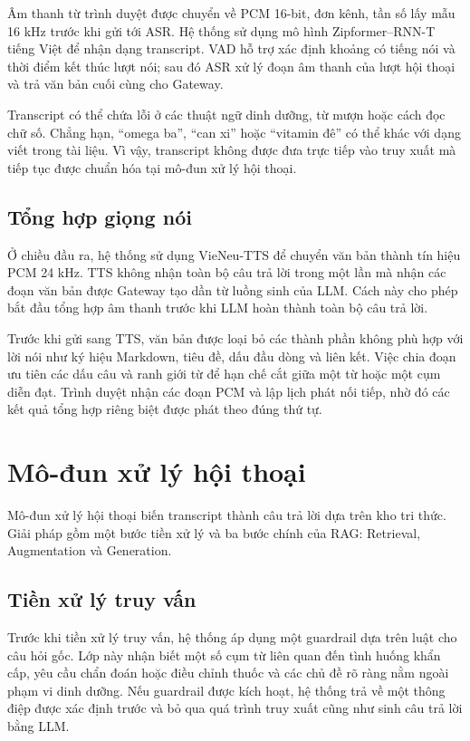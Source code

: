 \documentclass[a4paper,13pt,oneside]{report}
\begin{document}
Âm thanh từ trình duyệt được chuyển về PCM 16-bit, đơn kênh, tần số lấy mẫu 16 kHz trước khi gửi tới ASR. Hệ thống sử dụng mô hình Zipformer--RNN-T tiếng Việt để nhận dạng transcript. VAD hỗ trợ xác định khoảng có tiếng nói và thời điểm kết thúc lượt nói; sau đó ASR xử lý đoạn âm thanh của lượt hội thoại và trả văn bản cuối cùng cho Gateway.

Transcript có thể chứa lỗi ở các thuật ngữ dinh dưỡng, từ mượn hoặc cách đọc chữ số. Chẳng hạn, ``omega ba'', ``can xi'' hoặc ``vitamin đê'' có thể khác với dạng viết trong tài liệu. Vì vậy, transcript không được đưa trực tiếp vào truy xuất mà tiếp tục được chuẩn hóa tại mô-đun xử lý hội thoại.

\subsection{Tổng hợp giọng nói}

Ở chiều đầu ra, hệ thống sử dụng VieNeu-TTS để chuyển văn bản thành tín hiệu PCM 24 kHz. TTS không nhận toàn bộ câu trả lời trong một lần mà nhận các đoạn văn bản được Gateway tạo dần từ luồng sinh của LLM. Cách này cho phép bắt đầu tổng hợp âm thanh trước khi LLM hoàn thành toàn bộ câu trả lời.

Trước khi gửi sang TTS, văn bản được loại bỏ các thành phần không phù hợp với lời nói như ký hiệu Markdown, tiêu đề, dấu đầu dòng và liên kết. Việc chia đoạn ưu tiên các dấu câu và ranh giới từ để hạn chế cắt giữa một từ hoặc một cụm diễn đạt. Trình duyệt nhận các đoạn PCM và lập lịch phát nối tiếp, nhờ đó các kết quả tổng hợp riêng biệt được phát theo đúng thứ tự.

\section{Mô-đun xử lý hội thoại}

Mô-đun xử lý hội thoại biến transcript thành câu trả lời dựa trên kho tri thức. Giải pháp gồm một bước tiền xử lý và ba bước chính của RAG: Retrieval, Augmentation và Generation.

\subsection{Tiền xử lý truy vấn}

Trước khi tiền xử lý truy vấn, hệ thống áp dụng một guardrail dựa trên luật cho câu hỏi gốc. Lớp này nhận biết một số cụm từ liên quan đến tình huống khẩn cấp, yêu cầu chẩn đoán hoặc điều chỉnh thuốc và các chủ đề rõ ràng nằm ngoài phạm vi dinh dưỡng. Nếu guardrail được kích hoạt, hệ thống trả về một thông điệp được xác định trước và bỏ qua quá trình truy xuất cũng như sinh câu trả lời bằng LLM.
\end{document}
